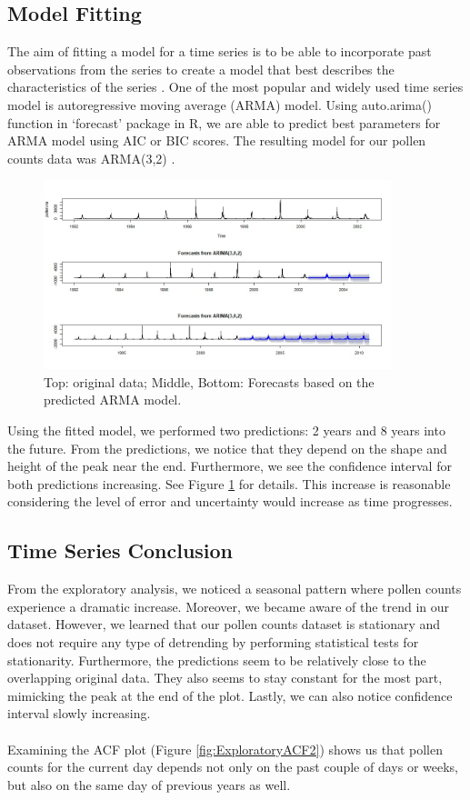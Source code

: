 \documentclass[a4paper,11pt]{article}
\begin{document}
\subsection{Model Fitting}
The aim of fitting a model for a time series is to be able to incorporate past observations from the series to create a model that best describes the characteristics of the series \cite{DBLP:journals/corr/abs-1302-6613}. One of the most popular and widely used time series model is autoregressive moving average (ARMA) model.
Using auto.arima() function in `forecast' package in R, we are able to predict best parameters for ARMA model using AIC or BIC scores. The resulting model for our pollen counts data was ARMA(3,2) \cite{hyndman2007automatic}.\\

\begin{figure}
	\centering
	\includegraphics[width=0.9\textwidth]{InkedPredict3_LI.jpg}
	\caption{Top: original data; Middle, Bottom: Forecasts based on the predicted ARMA model.}
	\label{fig:ExploratoryACF}
\end{figure}
\noindent
Using the fitted model, we performed two predictions: 2 years and 8 years into the future. From the predictions, we notice that they depend on the shape and height of the peak near the end. Furthermore, we see the confidence interval for both predictions increasing. See Figure \ref{fig:ExploratoryACF} for details. This increase is reasonable considering the level of error and uncertainty would increase as time progresses.
\subsection{Time Series Conclusion}

From the exploratory analysis, we noticed a seasonal pattern where pollen counts experience a dramatic increase. Moreover, we became aware of the trend in our dataset. However, we learned that our pollen counts dataset is stationary and does not require any type of detrending by performing statistical tests for stationarity. Furthermore, the predictions seem to be relatively close to the overlapping original data. They also seems to stay constant for the most part, mimicking the peak at the end of the plot. Lastly, we can also notice confidence interval slowly increasing.\\\\Examining the ACF plot (Figure \ref{fig:ExploratoryACF2}) shows us that pollen counts for the current day depends not only on the past couple of days or weeks, but also on the same day of previous years as well.
\end{document}
